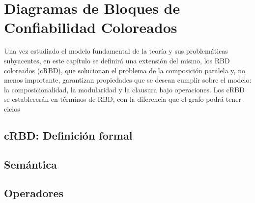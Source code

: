 \chapter{Diagramas de Bloques de Confiabilidad Coloreados}
\label{chapter:crbd}
Una vez estudiado el modelo fundamental de la teoría y sus problemáticas subyacentes, en este capítulo se definirá una extensión del mismo, los RBD coloreados (cRBD), que solucionan el problema de la composición paralela y, no menos importante, garantizan propiedades que se desean cumplir sobre el modelo: la composicionalidad, la modularidad y la clausura bajo operaciones. Los cRBD se establecerán en términos de RBD, con la diferencia que el grafo podrá tener ciclos

\section{cRBD: Definición formal}
\label{chapter:crbd_definicion}

\section{Semántica}
\label{sec:crbd_semantica}

\section{Operadores}
\label{sec:crbd_operadores}
